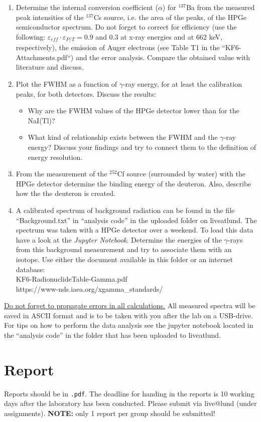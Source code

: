 \documentclass[12pt]{article}
\begin{document}
\begin{enumerate}
  \item Determine the internal conversion coefficient ($\alpha$) for $^{137}$Ba from the measured peak intensities of the $^{137}$Cs source, i.e. the area of the peaks, of the HPGe semiconductor spectrum. Do not forget to correct for efficiency (use the following: $\varepsilon_{eff} \cdot \varepsilon_{P/T} = 0.9$ and 0.3 at x-ray energies and at 662 keV, respectively), the emission of Auger electrons (see Table T1 in the ``KF6-Attachments.pdf``) and the error analysis. Compare the obtained value with literature and discuss.
  \item Plot the FWHM as a function of $\gamma$-ray energy, for at least the calibration peaks, for both detectors. Discuss the results:
    \begin{itemize}
      \item Why are the FWHM values of the HPGe detector lower than for the NaI(Tl)?
      \item What kind of relationship exists between the FWHM and the $\gamma$-ray energy? Discuss your findings and try to connect them to the definition of energy resolution.
    \end{itemize}
  \item From the measurement of the $^{252}$Cf source (surrounded by water) with the HPGe detector determine the binding energy of the deuteron. Also, describe how the the deuteron is created.
  \item A calibrated spectrum of background radiation can be found in the file ``Background.txt'' in ``analysis code'' in the uploaded folder on liveatlund. The spectrum was taken with a HPGe detector over a weekend. To load this data have a look at the {\it Jupyter Notebook}. Determine the energies of the $\gamma$-rays from this background measurement and try to associate them with an isotope. Use either the document available in this folder or an internet database: \\
    KF6-RadionuclideTable-Gamma.pdf \\
    https://www-nds.iaea.org/xgamma\_standards/
\end{enumerate}

\underline{Do not forget to propagate errors in all calculations.} All measured spectra will be saved in ASCII format and is to be taken with you after the lab on a USB-drive. For tips on how to perform the data analysis see the jupyter notebook located in the ``analysis code'' in the folder that has been uploaded to liveatlund.


\section*{Report}
Reports should be in \texttt{.pdf}. The deadline for handing in the reports is 10 working days after the laboratory has been conducted.
Please submit via live@lund (under assignments).
{\bf NOTE:} only 1 report per group should be submitted!
\end{document}
